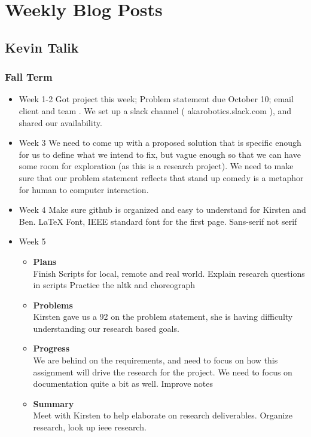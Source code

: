 
\section{Weekly Blog Posts}
	\subsection{Kevin Talik}
	\subsubsection{Fall Term}
	\begin{itemize}
		\item{Week 1-2}
			Got project this week; Problem statement due October 10; email client and team . 
			We set up a slack channel ( akarobotics.slack.com ), and shared our availability. 
		\item{Week 3}
			We need to come up with a proposed solution that is specific enough for us to define what we intend to fix, but vague enough so that we can have some room for exploration (as this is a research project). 
			We need to make sure that our problem statement reflects that stand up comedy is a metaphor for human to computer interaction. 

			 
		\item{Week 4}
		Make sure github is organized and easy to understand for Kirsten and Ben. 
		LaTeX Font, IEEE standard font for the first page. Sans-serif not serif 
		\item{Week 5}
			\begin{itemize}
				\item \textbf{Plans} \\
				Finish Scripts for local, remote and real world. 
				Explain research questions in scripts 
				Practice the nltk and choreograph 
				\item \textbf{Problems} \\
				Kirsten gave us a 92 on the problem statement, she is having difficulty understanding our research based goals. 
				\item \textbf{Progress} \\
				We are behind on the requirements, and need to focus on how this assignment will drive the research for the project.
				We need to focus on documentation quite a bit as well. Improve notes
				\item \textbf{Summary} \\
				Meet with Kirsten to help elaborate on research deliverables.  
				Organize research, look up ieee research. 
			\end{itemize}


\end{itemize}
